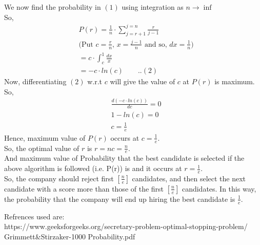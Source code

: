 \documentclass[12pt]{article}
\begin{document}
\begin{solution}
        We now find the probability in $(1)$ using integration as $n \rightarrow \inf$\\
        So, 
        \begin{align*}
            &P(r)= \frac{1}{n} \cdot \sum_{j=r+1}^{j=n} \frac{r}{j-1}\\
            &\text{(Put $c  = \frac{r}{n}$, $x = \frac{j-1}{n}$ and so, $dx = \frac{1}{n}$)}\\
            &=c \cdot \int_{c}^{1}\frac{dx}{x}\\
            &=-c \cdot ln(c)\quad\quad..(2)
        \end{align*}
        Now, differentiating $(2)$ w.r.t $c$ will give the value of $c$ at $P(r)$ is maximum.\\
        So, 
        \begin{align*}
            &\frac{d(-c\cdot ln(c))}{dc}=0\\
            &1-ln(c)=0\\
            &c=\frac{1}{e}
        \end{align*}
        Hence, maximum value of $P(r)$ occurs at $c=\frac{1}{e}$.\\
        So, the optimal value of $r$ is $r=nc=$\boldmath$\frac{n}{e}$.\\
        And maximum value of Probability that the best candidate is selected if the above algorithm is followed (i.e. P(r)) is  and it occurs at $r=\frac{1}{e}$.\\
        
        So, the company should reject first $[\frac{n}{e}]$ candidates, and then select the next candidate with a score more than those of the first $[\frac{n}{e}]$ candidates. In this way, the probability that the company will end up hiring the best candidate is $\frac{1}{e}$.
    \end{solution}
     Refrences used are:\\
    https://www.geeksforgeeks.org/secretary-problem-optimal-stopping-problem/\\
    Grimmett&Stirzaker-1000 Probability.pdf
   
\end{document}
